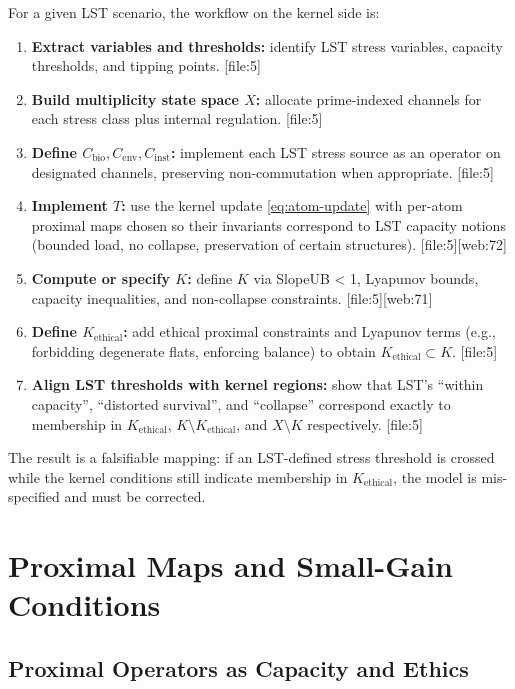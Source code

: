 \documentclass[11pt]{article}
\begin{document}
For a given LST scenario, the workflow on the kernel side is:

\begin{enumerate}[label=\arabic*., leftmargin=*]
  \item \textbf{Extract variables and thresholds:} identify LST stress variables, capacity thresholds, and tipping points. [file:5]
  \item \textbf{Build multiplicity state space \(X\):} allocate prime-indexed channels for each stress class plus internal regulation. [file:5]
  \item \textbf{Define \(C_{\text{bio}}, C_{\text{env}}, C_{\text{inst}}\):} implement each LST stress source as an operator on designated channels, preserving non-commutation when appropriate. [file:5]
  \item \textbf{Implement \(T\):} use the kernel update \eqref{eq:atom-update} with per-atom proximal maps chosen so their invariants correspond to LST capacity notions (bounded load, no collapse, preservation of certain structures). [file:5][web:72]
  \item \textbf{Compute or specify \(K\):} define \(K\) via SlopeUB < 1, Lyapunov bounds, capacity inequalities, and non-collapse constraints. [file:5][web:71]
  \item \textbf{Define \(K_{\text{ethical}}\):} add ethical proximal constraints and Lyapunov terms (e.g., forbidding degenerate flats, enforcing balance) to obtain \(K_{\text{ethical}}\subset K\). [file:5]
  \item \textbf{Align LST thresholds with kernel regions:} show that LST's ``within capacity'', ``distorted survival'', and ``collapse'' correspond exactly to membership in \(K_{\text{ethical}}\), \(K\setminus K_{\text{ethical}}\), and \(X\setminus K\) respectively. [file:5]
\end{enumerate}

The result is a falsifiable mapping: if an LST-defined stress threshold is crossed while the kernel conditions still indicate membership in \(K_{\text{ethical}}\), the model is mis-specified and must be corrected.

\section{Proximal Maps and Small-Gain Conditions}

\subsection{Proximal Operators as Capacity and Ethics}
\end{document}
